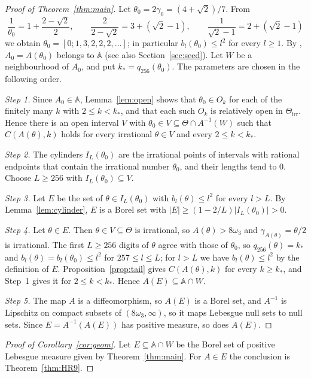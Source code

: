 \documentclass{amsart}
\theoremstyle{definition}
\theoremstyle{remark}
\numberwithin{equation}{section}
\newcommand{\AAA}{\mathbb{A}}
\newcommand{\meas}[1]{\lvert #1 \rvert}
\begin{document}
\begin{proof}[Proof of Theorem~\ref{thm:main}]
Let $\theta_0=2\gamma_0=(4+\sqrt2)/7$. From
\[
\frac1{\theta_0}=1+\frac{2-\sqrt2}{2},\qquad\frac{2}{2-\sqrt2}=3+(\sqrt2-1),\qquad\frac1{\sqrt2-1}=2+(\sqrt2-1)
\]
we obtain $\theta_0=[0;1,3,2,2,2,\dots]$; in particular $b_l(\theta_0)\le l^2$ for every $l\ge1$. By \cite[Section~4.2]{HR}, $A_0=A(\theta_0)$ belongs to $\AAA$ (see also Section~\ref{sec:seed}). Let $W$ be a neighbourhood of $A_0$, and put $k_*=q_{256}(\theta_0)$. The parameters are chosen in the following order.

\emph{Step 1.} Since $A_0\in\AAA$, Lemma~\ref{lem:open} shows that $\theta_0\in O_k$ for each of the finitely many $k$ with $2\le k<k_*$, and that each such $O_k$ is relatively open in $\Theta_{\mathrm{irr}}$. Hence there is an open interval $V$ with $\theta_0\in V\subseteq\Theta\cap A^{-1}(W)$ such that $C(A(\theta),k)$ holds for every irrational $\theta\in V$ and every $2\le k<k_*$.

\emph{Step 2.} The cylinders $I_L(\theta_0)$ are the irrational points of intervals with rational endpoints that contain the irrational number $\theta_0$, and their lengths tend to $0$. Choose $L\ge256$ with $I_L(\theta_0)\subseteq V$.

\emph{Step 3.} Let $E$ be the set of $\theta\in I_L(\theta_0)$ with $b_l(\theta)\le l^2$ for every $l>L$. By Lemma~\ref{lem:cylinder}, $E$ is a Borel set with $\meas{E}\ge(1-2/L)\meas{I_L(\theta_0)}>0$.

\emph{Step 4.} Let $\theta\in E$. Then $\theta\in V\subseteq\Theta$ is irrational, so $A(\theta)>8\omega_3$ and $\gamma_{A(\theta)}=\theta/2$ is irrational. The first $L\ge256$ digits of $\theta$ agree with those of $\theta_0$, so $q_{256}(\theta)=k_*$ and $b_l(\theta)=b_l(\theta_0)\le l^2$ for $257\le l\le L$; for $l>L$ we have $b_l(\theta)\le l^2$ by the definition of $E$. Proposition~\ref{prop:tail} gives $C(A(\theta),k)$ for every $k\ge k_*$, and Step~1 gives it for $2\le k<k_*$. Hence $A(E)\subseteq\AAA\cap W$.

\emph{Step 5.} The map $A$ is a diffeomorphism, so $A(E)$ is a Borel set, and $A^{-1}$ is Lipschitz on compact subsets of $(8\omega_3,\infty)$, so it maps Lebesgue null sets to null sets. Since $E=A^{-1}(A(E))$ has positive measure, so does $A(E)$.
\end{proof}

\begin{proof}[Proof of Corollary~\ref{cor:geom}]
Let $E\subseteq\AAA\cap W$ be the Borel set of positive Lebesgue measure given by Theorem~\ref{thm:main}. For $A\in E$ the conclusion is Theorem~\ref{thm:HR9}.
\end{proof}
\end{document}
